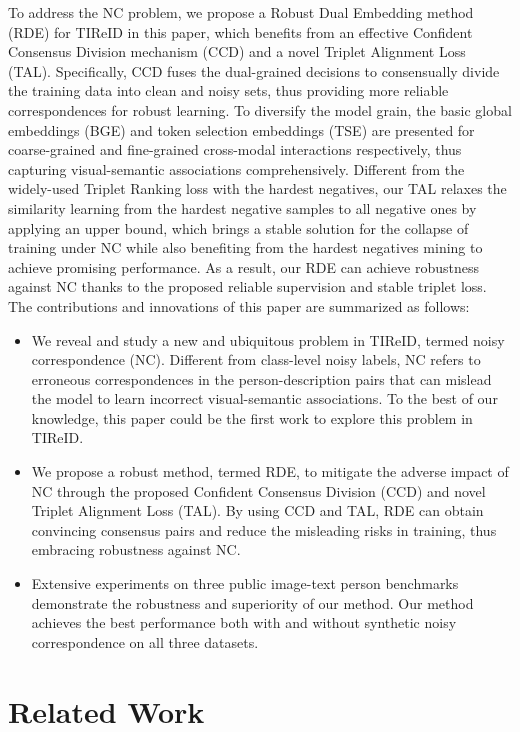 \documentclass[10pt,twocolumn,letterpaper]{article}
\begin{document}
To address the NC problem, we propose a Robust Dual Embedding method (RDE) for TIReID in this paper, which benefits from an effective Confident Consensus Division mechanism (CCD) and a novel Triplet Alignment Loss (TAL). Specifically, CCD fuses the dual-grained decisions to consensually divide the training data into clean and noisy sets, thus providing more reliable correspondences for robust learning. To diversify the model grain, the basic global embeddings (BGE) and token selection embeddings (TSE) are presented for coarse-grained and fine-grained cross-modal interactions respectively, thus capturing visual-semantic associations comprehensively.  Different from the widely-used Triplet Ranking loss with the hardest negatives, our TAL relaxes the similarity learning from the hardest negative samples to all negative ones by applying an upper bound, which brings a stable solution for the collapse of training under NC while also benefiting from the hardest negatives mining to achieve promising performance. As a result, our RDE can achieve robustness against NC thanks to the proposed reliable supervision and stable triplet loss. The contributions and innovations of this paper are summarized as follows:

\begin{itemize}
    \item We reveal and study a new and ubiquitous problem in TIReID, termed noisy correspondence (NC). Different from class-level noisy labels, NC refers to erroneous correspondences in the person-description pairs that can mislead the model to learn incorrect visual-semantic associations. To the best of our knowledge, this paper could be the first work to explore this problem in TIReID.
    \item We propose a robust method, termed RDE, to mitigate the adverse impact of NC through the proposed Confident Consensus Division (CCD) and novel Triplet Alignment Loss (TAL). By using CCD and TAL, RDE can obtain convincing consensus pairs and reduce the misleading risks in training, thus embracing robustness against NC.
    \item Extensive experiments on three public image-text person benchmarks demonstrate the robustness and superiority of our method. Our method achieves the best performance both with and without synthetic noisy correspondence on all three datasets.
\end{itemize}


\section{Related Work}
\end{document}
